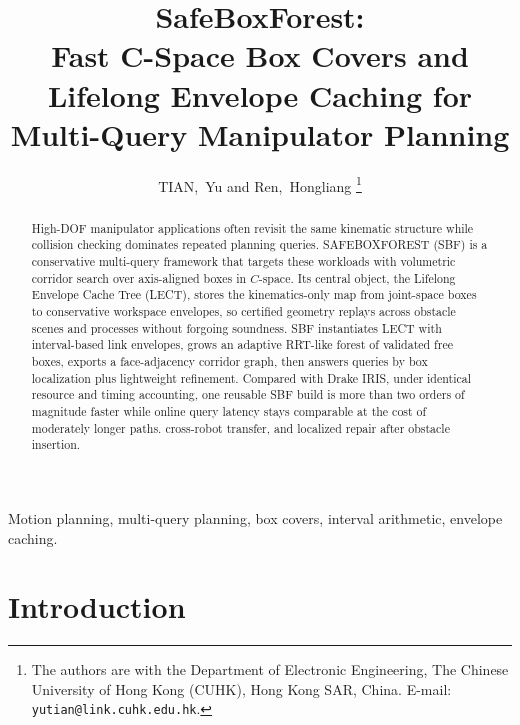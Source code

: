 \documentclass[journal]{IEEEtran}
\DeclareRobustCommand{\textsc}[1]{\textnormal{\MakeUppercase{#1}}}
\begin{document}
\title{SafeBoxForest:\\ Fast C-Space Box Covers and Lifelong Envelope Caching
for Multi-Query Manipulator Planning}

\author{TIAN,~Yu and Ren,~Hongliang%
\thanks{The authors are with the Department of Electronic Engineering,
The Chinese University of Hong Kong (CUHK), Hong Kong SAR, China.
E-mail: \texttt{yutian@link.cuhk.edu.hk}.}}

\maketitle

\begin{abstract}
High-DOF manipulator applications often revisit the same kinematic structure while
collision checking dominates repeated planning queries.
\textsc{SafeBoxForest} (SBF) is a conservative multi-query framework that
targets these workloads with volumetric corridor search over axis-aligned boxes in $C$-space.
Its central object, the Lifelong Envelope Cache Tree (LECT), stores the
kinematics-only map from joint-space boxes to conservative workspace envelopes, so
certified geometry replays across obstacle scenes and processes without forgoing
soundness.
SBF instantiates LECT with interval-based link envelopes, grows an adaptive
RRT-like forest of validated free boxes, exports a face-adjacency corridor graph,
then answers queries by box localization plus lightweight refinement.
Compared with Drake IRIS,
under identical resource and timing accounting, one reusable SBF build is more than two orders of magnitude faster
while online query latency stays comparable at the cost of moderately longer paths.
cross-robot transfer, and localized repair after obstacle insertion.
\end{abstract}

\begin{IEEEkeywords}
Motion planning, multi-query planning, box covers, interval arithmetic, envelope caching.
\end{IEEEkeywords}

\section{Introduction}\label{sec:intro}
\end{document}
